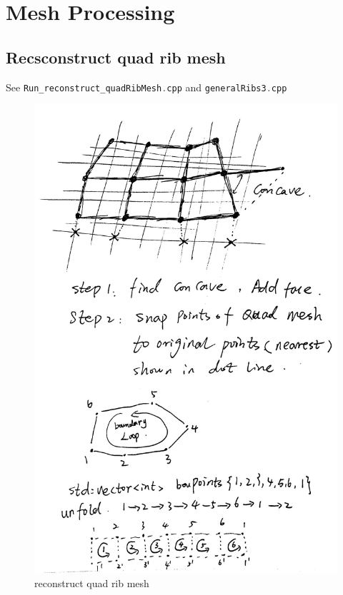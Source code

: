 
\chapter{Mesh Processing}

\section{Recsconstruct quad rib mesh}
See \lstinline[language=C++]|Run_reconstruct_quadRibMesh.cpp| and \lstinline[language=C++]|generalRibs3.cpp|
\begin{figure}[h!]
	\centering
	\includegraphics[width=0.7\linewidth]{Figures/reconstruct_quadRibMesh}
	\caption{reconstruct quad rib mesh}
	\label{fig:reconstructquadribmesh}
\end{figure}

